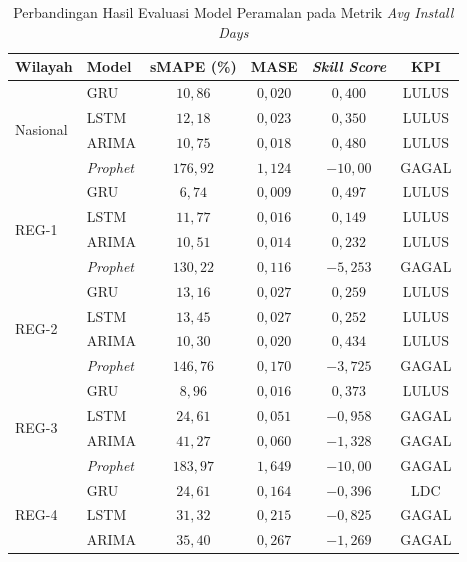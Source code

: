 \begin{table}[htbp]
\centering
\caption{Perbandingan Hasil Evaluasi Model Peramalan pada Metrik \textit{Avg Install Days}}
\label{tab:hasil-forecasting-komparasi}
\begin{tabular}{|p{2.2cm}|p{1.5cm}|c|c|c|c|}
\hline
\textbf{Wilayah} & \textbf{Model} & \textbf{sMAPE (\%)} & \textbf{MASE} & \textbf{\textit{Skill Score}} & \textbf{KPI} \\
\hline
\multirow{4}{*}{Nasional} & GRU & $10{,}86$ & $0{,}020$ & $0{,}400$ & LULUS \\
\cline{2-6}
 & LSTM & $12{,}18$ & $0{,}023$ & $0{,}350$ & LULUS \\
\cline{2-6}
 & ARIMA & $10{,}75$ & $0{,}018$ & $0{,}480$ & LULUS \\
\cline{2-6}
 & \textit{Prophet} & $176{,}92$ & $1{,}124$ & $-10{,}00$ & GAGAL \\
\hline
\multirow{4}{*}{REG-1} & GRU & $6{,}74$ & $0{,}009$ & $0{,}497$ & LULUS \\
\cline{2-6}
 & LSTM & $11{,}77$ & $0{,}016$ & $0{,}149$ & LULUS \\
\cline{2-6}
 & ARIMA & $10{,}51$ & $0{,}014$ & $0{,}232$ & LULUS \\
\cline{2-6}
 & \textit{Prophet} & $130{,}22$ & $0{,}116$ & $-5{,}253$ & GAGAL \\
\hline
\multirow{4}{*}{REG-2} & GRU & $13{,}16$ & $0{,}027$ & $0{,}259$ & LULUS \\
\cline{2-6}
 & LSTM & $13{,}45$ & $0{,}027$ & $0{,}252$ & LULUS \\
\cline{2-6}
 & ARIMA & $10{,}30$ & $0{,}020$ & $0{,}434$ & LULUS \\
\cline{2-6}
 & \textit{Prophet} & $146{,}76$ & $0{,}170$ & $-3{,}725$ & GAGAL \\
\hline
\multirow{4}{*}{REG-3} & GRU & $8{,}96$ & $0{,}016$ & $0{,}373$ & LULUS \\
\cline{2-6}
 & LSTM & $24{,}61$ & $0{,}051$ & $-0{,}958$ & GAGAL \\
\cline{2-6}
 & ARIMA & $41{,}27$ & $0{,}060$ & $-1{,}328$ & GAGAL \\
\cline{2-6}
 & \textit{Prophet} & $183{,}97$ & $1{,}649$ & $-10{,}00$ & GAGAL \\
\hline
\multirow{4}{*}{REG-4} & GRU & $24{,}61$ & $0{,}164$ & $-0{,}396$ & LDC \\
\cline{2-6}
 & LSTM & $31{,}32$ & $0{,}215$ & $-0{,}825$ & GAGAL \\
\cline{2-6}
 & ARIMA & $35{,}40$ & $0{,}267$ & $-1{,}269$ & GAGAL \\

\end{tabular}
\end{table}
